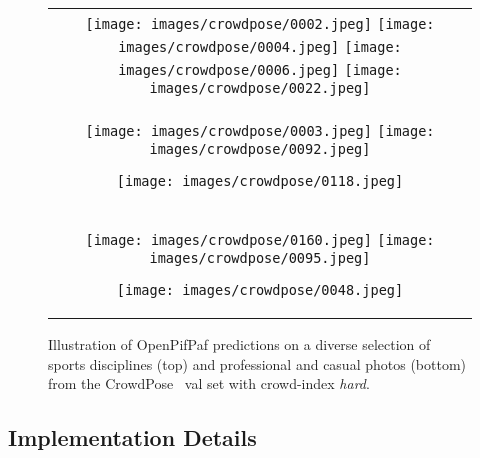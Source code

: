\documentclass[journal]{IEEEtran}
\begin{document}
\begin{figure*}
  \centering
  \begin{tabular}{c}
    \texttt{[image: images/crowdpose/0002.jpeg]}
    \texttt{[image: images/crowdpose/0004.jpeg]}
    \texttt{[image: images/crowdpose/0006.jpeg]}
    \texttt{[image: images/crowdpose/0022.jpeg]}

    \\

    \texttt{[image: images/crowdpose/0003.jpeg]}
    \texttt{[image: images/crowdpose/0092.jpeg]}














    \texttt{[image: images/crowdpose/0118.jpeg]}

    \\

    \texttt{[image: images/crowdpose/0160.jpeg]}
    \texttt{[image: images/crowdpose/0095.jpeg]}

\texttt{[image: images/crowdpose/0048.jpeg]}


  \end{tabular}
  \caption{
    Illustration of OpenPifPaf predictions on a diverse selection of sports disciplines (top)
    and professional and casual photos (bottom) from the
    CrowdPose~\cite{li2019crowdpose} val set with crowd-index \emph{hard}.
  }
  \label{fig:crowdpose-examples}
\end{figure*}


\subsection{Implementation Details}
\end{document}

